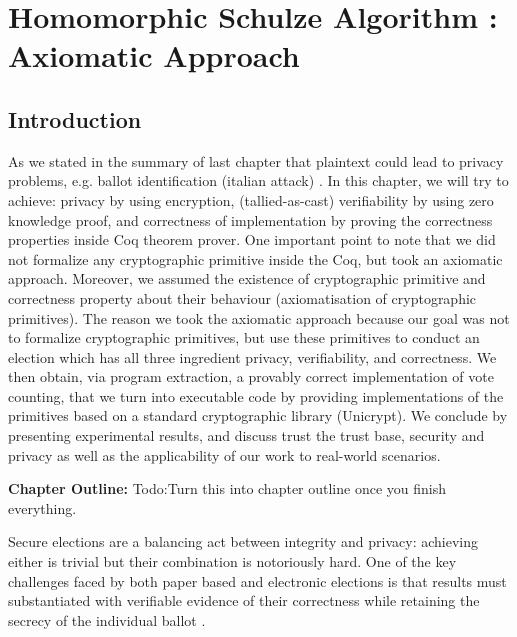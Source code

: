 \chapter{Homomorphic Schulze Algorithm : Axiomatic Approach}
\label{cha:homormorphic_schulze}

\section{Introduction}
As we stated in the  summary of last chapter that plaintext could lead to 
privacy problems, e.g. ballot identification (italian attack) \cite{Otten}. 
In this chapter, we will try to achieve: privacy by using encryption, (tallied-as-cast) 
verifiability by using zero knowledge proof, and correctness of implementation 
by proving the correctness properties inside Coq theorem prover. 
One important point to note that we did not formalize any cryptographic primitive inside the Coq, but 
took an axiomatic approach. Moreover, we assumed the existence of cryptographic 
primitive and correctness property about their behaviour (axiomatisation of 
cryptographic primitives). The reason we took the axiomatic approach 
because our goal was not to formalize cryptographic primitives, but use these primitives
to conduct an election which has all three ingredient privacy, verifiability, 
and correctness. We then obtain, via program extraction, a
provably correct implementation of vote counting, that we turn
into executable code by providing implementations of the primitives
based on a standard cryptographic library (Unicrypt). 
We conclude by presenting
experimental results, and discuss trust the trust base, security and
privacy as well as the applicability of our work to real-world
scenarios. 




\textbf{Chapter Outline:}
 Todo:Turn this into chapter outline once you finish everything.



Secure elections are a balancing act between integrity and privacy:
achieving either is trivial but their combination is notoriously hard.
One of the key challenges faced by both paper based and electronic
elections is that results must substantiated with
verifiable evidence of their correctness while retaining the secrecy
of the individual ballot \citep{Bernhard:2017:PES}.  


